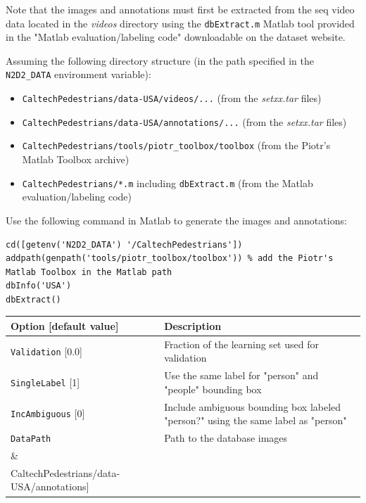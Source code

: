 \documentclass[a4paper,11pt,oneside]{article}
\newenvironment{myitemize}
{ \begin{itemize}
    \setlength{\itemsep}{0pt}
    \setlength{\parskip}{0pt}
    \setlength{\parsep}{0pt}     }
{ \end{itemize}                  }
\begin{document}
Note that the images and annotations must first be extracted from the seq video
 data located in the \emph{videos} directory using the \lstinline!dbExtract.m!
 Matlab tool provided in the "Matlab evaluation/labeling code" downloadable on
 the dataset website.

Assuming the following directory structure (in the path specified in the \lstinline!N2D2_DATA! environment variable):
\begin{myitemize}
\item \lstinline!CaltechPedestrians/data-USA/videos/...!
(from the \emph{setxx.tar} files)
\item \lstinline!CaltechPedestrians/data-USA/annotations/...!
(from the \emph{setxx.tar} files)
\item \lstinline!CaltechPedestrians/tools/piotr_toolbox/toolbox!
(from the Piotr's Matlab Toolbox archive)
\item \lstinline!CaltechPedestrians/*.m! including \lstinline!dbExtract.m!
(from the Matlab evaluation/labeling code)
\end{myitemize}

Use the following command in Matlab to generate the images and annotations:
\begin{lstlisting}[style=matlab]
cd([getenv('N2D2_DATA') '/CaltechPedestrians'])
addpath(genpath('tools/piotr_toolbox/toolbox')) % add the Piotr's Matlab Toolbox in the Matlab path
dbInfo('USA')
dbExtract()
\end{lstlisting}

\begin{center}
 \begin{tabular}{| p{5cm} | p{10cm} | }
 \hline
 Option [default value] & Description\\
 \hline\hline
  \lstinline!Validation! [0.0] & Fraction of the learning set used for
  validation \\
  \lstinline!SingleLabel! [1] & Use the same label for "person" and "people"
  bounding box \\
  \lstinline!IncAmbiguous! [0] & Include ambiguous bounding box labeled
  "person?" using the same label as "person" \\
  \lstinline!DataPath! & Path to the database images \\
    & \\
  \lstinline!LabelPath! & Path to the database annotations \\
   \noindent [\lstinline!$N2D2_DATA!/ & \\
   \noindent CaltechPedestrians/data-USA/annotations] & \\
 \hline
\end{tabular}
\end{center}
\end{document}
